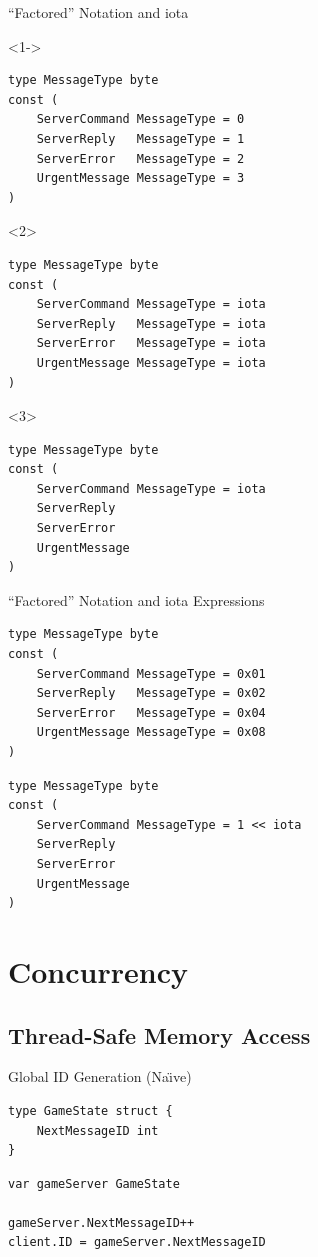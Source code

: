 \documentclass[pdf]{beamer}
\begin{document}
\begin{frame}[fragile]{``Factored'' Notation and iota}
\begin{onlyenv}<1->
\begin{lstlisting}
type MessageType byte
const (
    ServerCommand MessageType = 0
    ServerReply   MessageType = 1
    ServerError   MessageType = 2
    UrgentMessage MessageType = 3
)
\end{lstlisting}
\end{onlyenv}
\vfill\strut
\begin{onlyenv}<2>
\begin{lstlisting}
type MessageType byte
const (
    ServerCommand MessageType = iota
    ServerReply   MessageType = iota
    ServerError   MessageType = iota
    UrgentMessage MessageType = iota
)
\end{lstlisting}
\end{onlyenv}
\begin{onlyenv}<3>
\begin{lstlisting}
type MessageType byte
const (
    ServerCommand MessageType = iota
    ServerReply   
    ServerError   
    UrgentMessage 
)
\end{lstlisting}
\end{onlyenv}
\end{frame}
\begin{frame}[fragile]{``Factored'' Notation and iota Expressions}
\begin{lstlisting}
type MessageType byte
const (
    ServerCommand MessageType = 0x01
    ServerReply   MessageType = 0x02
    ServerError   MessageType = 0x04
    UrgentMessage MessageType = 0x08
)
\end{lstlisting}
\vfill\strut
\begin{lstlisting}
type MessageType byte
const (
    ServerCommand MessageType = 1 << iota
    ServerReply   
    ServerError   
    UrgentMessage 
)
\end{lstlisting}
\end{frame}
\section[Concurrency]{Concurrency}
\subsection{Thread-Safe Memory Access}
\begin{frame}[fragile]{Global ID Generation (Na\"\i ve)}
\begin{lstlisting}
type GameState struct {
    NextMessageID int
}
\end{lstlisting}
\pause
\begin{lstlisting}
var gameServer GameState

gameServer.NextMessageID++
client.ID = gameServer.NextMessageID
\end{lstlisting}
\end{frame}
\end{document}
